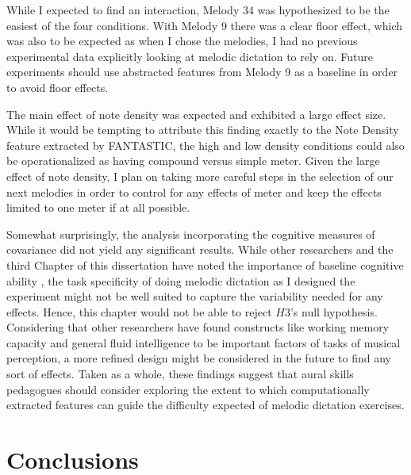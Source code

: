 \documentclass[12pt,]{book}
\begin{document}
While I expected to find an interaction, Melody 34 was hypothesized to be the easiest of the four conditions.
With Melody 9 there was a clear floor effect, which was also to be expected as when I chose the melodies, I had no previous experimental data explicitly looking at melodic dictation to rely on.
Future experiments should use abstracted features from Melody 9 as a baseline in order to avoid floor effects.

The main effect of note density was expected and exhibited a large effect size.
While it would be tempting to attribute this finding exactly to the Note Density feature extracted by FANTASTIC, the high and low density conditions could also be operationalized as having compound versus simple meter.
Given the large effect of note density, I plan on taking more careful steps in the selection of our next melodies in order to control for any effects of meter and keep the effects limited to one meter if at all possible.

Somewhat surprisingly, the analysis incorporating the cognitive measures of covariance did not yield any significant results.
While other researchers and the third Chapter of this dissertation have noted the importance of baseline cognitive ability \citep{schellenbergMusicCognitiveAbilities2013}, the task specificity of doing melodic dictation as I designed the experiment might not be well suited to capture the variability needed for any effects.
Hence, this chapter would not be able to reject \(H3\)'s null hypothesis.
Considering that other researchers have found constructs like working memory capacity and general fluid intelligence to be important factors of tasks of musical perception, a more refined design might be considered in the future to find any sort of effects.
Taken as a whole, these findings suggest that aural skills pedagogues should consider exploring the extent to which computationally extracted features can guide the difficulty expected of melodic dictation exercises.

\hypertarget{conclusions-3}{%
\section{Conclusions}\label{conclusions-3}}
\end{document}
